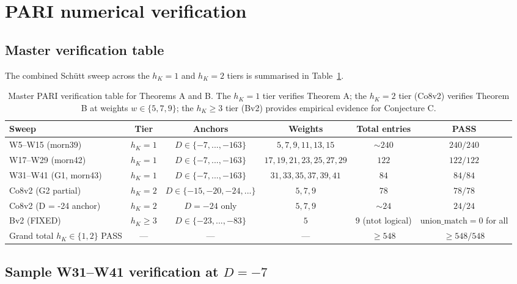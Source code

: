 \documentclass[11pt,a4paper]{amsart}
\theoremstyle{definition}
\newcommand{\hK}{h_{K}}
\begin{document}
\section{PARI numerical verification}\label{sec:pari-verif}

\subsection{Master verification table}\label{sec:pari-master}

The combined Sch\"utt sweep across the $\hK = 1$ and $\hK = 2$ tiers is summarised in Table~\ref{tab:master-pari}.

\begin{table}[h]
\centering
\caption{Master PARI verification table for Theorems A and B. The $\hK = 1$ tier verifies Theorem A; the $\hK = 2$ tier (Co8v2) verifies Theorem B at weights $w \in \{5, 7, 9\}$; the $\hK \ge 3$ tier (Bv2) provides empirical evidence for Conjecture C.}
\label{tab:master-pari}
\begin{tabular}{lccccc}
\toprule
Sweep & Tier & Anchors & Weights & Total entries & PASS \\
\midrule
W5--W15 (morn39) & $\hK = 1$ & $D \in \{-7,...,-163\}$ & $5, 7, 9, 11, 13, 15$ & $\sim 240$ & $240/240$ \\
W17--W29 (morn42) & $\hK = 1$ & $D \in \{-7,...,-163\}$ & $17, 19, 21, 23, 25, 27, 29$ & $122$ & $122/122$ \\
W31--W41 (G1, morn43) & $\hK = 1$ & $D \in \{-7,...,-163\}$ & $31, 33, 35, 37, 39, 41$ & $84$ & $84/84$ \\
Co8v2 (G2 partial) & $\hK = 2$ & $D \in \{-15, -20, -24, ...\}$ & $5, 7, 9$ & $78$ & $78/78$ \\
Co8v2 (D = -24 anchor) & $\hK = 2$ & $D = -24$ only & $5, 7, 9$ & $\sim 24$ & $24/24$ \\
Bv2 (FIXED) & $\hK \ge 3$ & $D \in \{-23,...,-83\}$ & $5$ & $9$ ($\mathrm{ntot}$ logical) & $\mathrm{union\_match} = 0$ for all \\
\midrule
Grand total $\hK \in \{1, 2\}$ PASS & --- & --- & --- & $\ge 548$ & $\ge 548/548$ \\
\bottomrule
\end{tabular}
\end{table}

\subsection{Sample W31--W41 verification at $D = -7$}\label{sec:pari-W31-W41}
\end{document}

